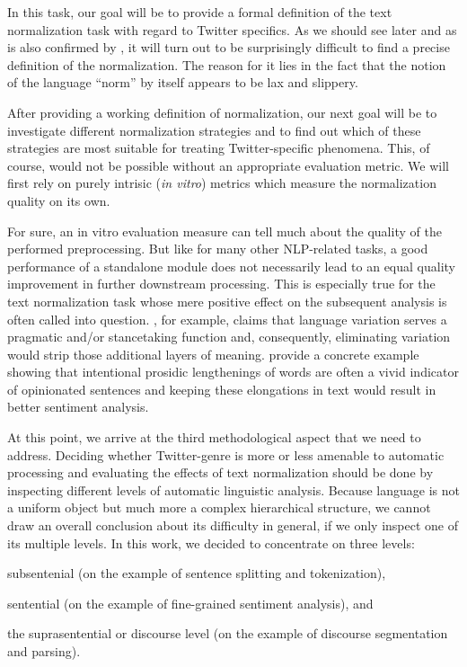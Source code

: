 In this task, our goal will be to provide a formal definition of the text
normalization task with regard to Twitter specifics.  As we should see later
and as is also confirmed by \citet{Eisenstein:13}, it will turn out to be
surprisingly difficult to find a precise definition of the normalization.  The
reason for it lies in the fact that the notion of the language ``norm'' by
itself appears to be lax and slippery.

After providing a working definition of normalization, our next goal will be
to investigate different normalization strategies and to find out which of
these strategies are most suitable for treating Twitter-specific phenomena.
This, of course, would not be possible without an appropriate evaluation
metric.  %
We will first rely on purely intrisic (\emph{in vitro}) metrics which measure
the normalization quality on its own.

For sure, an in vitro evaluation measure can tell much about the quality of
the performed preprocessing.  But like for many other NLP-related tasks, a
good performance of a standalone module does not necessarily lead to an equal
quality improvement in further downstream processing.  This is especially true
for the text normalization task whose mere positive effect on the subsequent
analysis is often called into question.  \citet{DuBois:07}, for example,
claims that language variation serves a pragmatic and/or stancetaking function
and, consequently, eliminating variation would strip those additional layers
of meaning.  \citet{BrodyDiakopoulos:11} provide a concrete example showing
that intentional prosidic lengthenings of words are often a vivid indicator of
opinionated sentences and keeping these elongations in text would result in
better sentiment analysis.

At this point, we arrive at the third methodological aspect that we need to
address.  Deciding whether Twitter-genre is more or less amenable to automatic
processing and evaluating the effects of text normalization should be done by
inspecting different levels of automatic linguistic analysis.  Because
language is not a uniform object but much more a complex hierarchical
structure, we cannot draw an overall conclusion about its difficulty in
general, if we only inspect one of its multiple levels.  In this work, we
decided to concentrate on three levels:
\begin{inparaenum}
  \item subsentenial (on the example of sentence splitting and tokenization),
  \item sentential (on the example of fine-grained sentiment analysis), and
  \item the suprasentential or discourse level (on the example of discourse
    segmentation and parsing).
\end{inparaenum}

